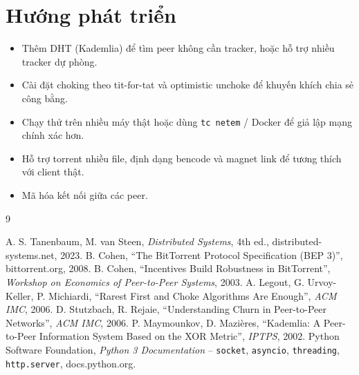 \documentclass[12pt,a4paper,oneside]{report}
\begin{document}
\section{Hướng phát triển}
\begin{itemize}
  \item Thêm DHT (Kademlia) để tìm peer không cần tracker, hoặc hỗ trợ nhiều tracker dự phòng.
  \item Cài đặt choking theo tit-for-tat và optimistic unchoke để khuyến khích chia sẻ công bằng.
  \item Chạy thử trên nhiều máy thật hoặc dùng \texttt{tc netem} / Docker để giả lập mạng chính xác hơn.
  \item Hỗ trợ torrent nhiều file, định dạng bencode và magnet link để tương thích với client thật.
  \item Mã hóa kết nối giữa các peer.
\end{itemize}

\begin{thebibliography}{9}
 A. S. Tanenbaum, M. van Steen, \textit{Distributed Systems}, 4th ed., distributed-systems.net, 2023.
 B. Cohen, ``The BitTorrent Protocol Specification (BEP 3)'', bittorrent.org, 2008.
 B. Cohen, ``Incentives Build Robustness in BitTorrent'', \textit{Workshop on Economics of Peer-to-Peer Systems}, 2003.
 A. Legout, G. Urvoy-Keller, P. Michiardi, ``Rarest First and Choke Algorithms Are Enough'', \textit{ACM IMC}, 2006.
 D. Stutzbach, R. Rejaie, ``Understanding Churn in Peer-to-Peer Networks'', \textit{ACM IMC}, 2006.
 P. Maymounkov, D. Mazières, ``Kademlia: A Peer-to-Peer Information System Based on the XOR Metric'', \textit{IPTPS}, 2002.
 Python Software Foundation, \textit{Python 3 Documentation} -- \texttt{socket}, \texttt{asyncio}, \texttt{threading}, \texttt{http.server}, docs.python.org.
\end{thebibliography}
\end{document}
